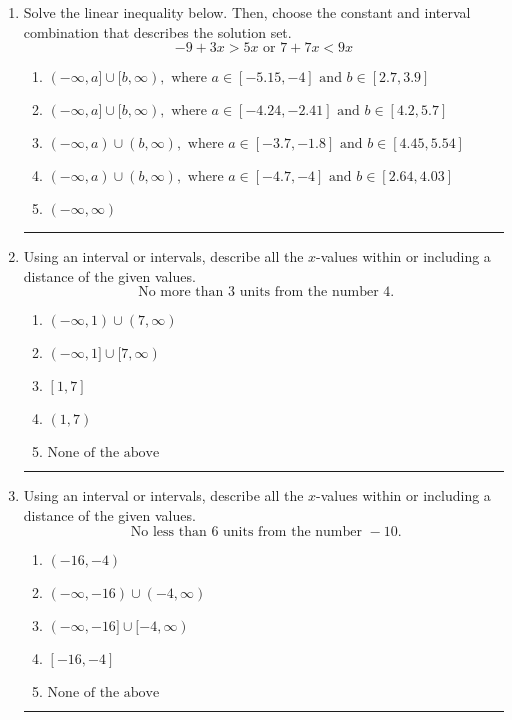 \documentclass[14pt]{extbook}
\newcommand{\litem}[1]{\item#1\hspace*{-1cm}\rule{\textwidth}{0.4pt}}
\begin{document}
\begin{enumerate}
\litem{
Solve the linear inequality below. Then, choose the constant and interval combination that describes the solution set.\[ -9 + 3 x > 5 x \text{ or } 7 + 7 x < 9 x \]\begin{enumerate}[label=\Alph*.]
\item \( (-\infty, a] \cup [b, \infty), \text{ where } a \in [-5.15, -4] \text{ and } b \in [2.7, 3.9] \)
\item \( (-\infty, a] \cup [b, \infty), \text{ where } a \in [-4.24, -2.41] \text{ and } b \in [4.2, 5.7] \)
\item \( (-\infty, a) \cup (b, \infty), \text{ where } a \in [-3.7, -1.8] \text{ and } b \in [4.45, 5.54] \)
\item \( (-\infty, a) \cup (b, \infty), \text{ where } a \in [-4.7, -4] \text{ and } b \in [2.64, 4.03] \)
\item \( (-\infty, \infty) \)

\end{enumerate} }
\litem{
Using an interval or intervals, describe all the $x$-values within or including a distance of the given values.\[ \text{ No more than } 3 \text{ units from the number } 4. \]\begin{enumerate}[label=\Alph*.]
\item \( (-\infty, 1) \cup (7, \infty) \)
\item \( (-\infty, 1] \cup [7, \infty) \)
\item \( [1, 7] \)
\item \( (1, 7) \)
\item \( \text{None of the above} \)

\end{enumerate} }
\litem{
Using an interval or intervals, describe all the $x$-values within or including a distance of the given values.\[ \text{ No less than } 6 \text{ units from the number } -10. \]\begin{enumerate}[label=\Alph*.]
\item \( (-16, -4) \)
\item \( (-\infty, -16) \cup (-4, \infty) \)
\item \( (-\infty, -16] \cup [-4, \infty) \)
\item \( [-16, -4] \)
\item \( \text{None of the above} \)


\end{enumerate}}
\end{enumerate}
\end{document}
